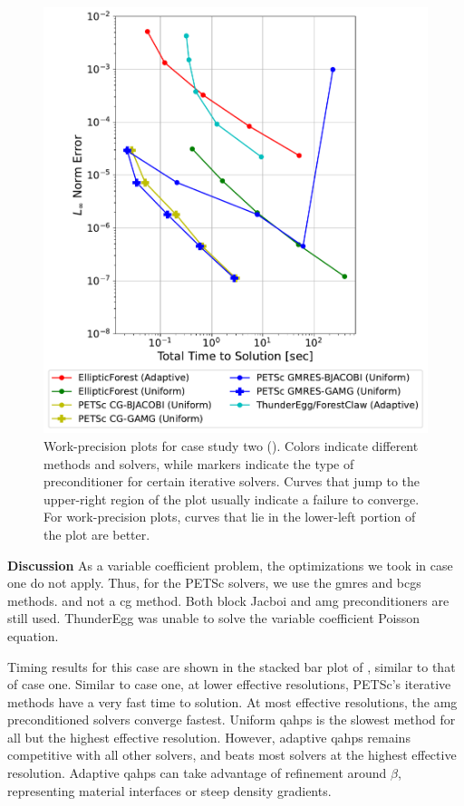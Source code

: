 \begin{figure}
    \centering
    \includegraphics[width=1.0\textwidth, clip=true, trim={0 0 0 0}]{figures/case02-work-precision-plots-no-title.pdf}
    \caption{Work-precision plots for case study two (). Colors indicate different methods and solvers, while markers indicate the type of preconditioner for certain iterative solvers. Curves that jump to the upper-right region of the plot usually indicate a failure to converge. For work-precision plots, curves that lie in the lower-left portion of the plot are better.}
    \label{fig:case02-work-precision-plot}
\end{figure}

{\bf Discussion}
As a variable coefficient problem, the optimizations we took in case one do not apply. Thus, for the PETSc solvers, we use the \gls{gmres} and \gls{bcgs} methods. and not a \gls{cg} method. Both block Jacboi and \gls{amg} preconditioners are still used. ThunderEgg was unable to solve the variable coefficient Poisson equation.

Timing results for this case are shown in the stacked bar plot of , similar to that of case one. Similar to case one, at lower effective resolutions, PETSc's iterative methods have a very fast time to solution. At most effective resolutions, the \gls{amg} preconditioned solvers converge fastest. Uniform \gls{qahps} is the slowest method for all but the highest effective resolution. However, adaptive \gls{qahps} remains competitive with all other solvers, and beats most solvers at the highest effective resolution. Adaptive \gls{qahps} can take advantage of refinement around $\beta$, representing material interfaces or steep density gradients.

